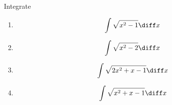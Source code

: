 Integrate
\begin{enumerate}[ref={\fcProblemRef}]
\item 
\[
\int \sqrt{x^2-1}\diff x
\]
\item 
\[
\int \sqrt{x^2-2}\diff x
\]
\item 
\[
\int \sqrt{2x^2+x-1}\diff x
\]
\item 
\[
\int \sqrt{x^2+x-1}\diff x
\]
\end{enumerate}